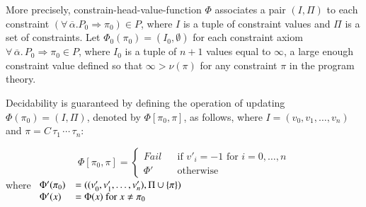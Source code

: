\documentclass[review]{elsarticle}
\begin{document}
\label{Phi0}
More precisely, constrain-head-value-function $\Phi$ associates a pair
$(I,\Pi)$ to each constraint $(\forall\, \overline{\alpha}. P_0
\Rightarrow \pi_0)\in P$, where $I$ is a tuple of constraint values
and $\Pi$ is a set of constraints. Let $\Phi_0(\pi_0) =
(I_0,\emptyset)$ for each constraint axiom $\forall\,
\overline{\alpha}.\,P_0 \Rightarrow \pi_0 \in P$, where $I_0$ is a
tuple of $n+1$ values equal to $\infty$, a large enough constraint
value defined so that $\infty > \nu(\pi)$ for any constraint
$\pi$ in the program theory.

Decidability is guaranteed by defining the operation of updating
$\Phi(\pi_0) = (I,\Pi)$, denoted by $\Phi[\pi_0,\pi]$, as follows,
where $I = (v_0, v_1,\ldots, v_n)$ and $\pi =
C\,\tau_1\,\cdots\,\tau_n$:

\[ \Phi[\pi_0,\pi] = \left\{ \begin{array}{lll}
                                   \textit{Fail}  & & \text{if } v'_i = -1 \text{ for } i=0,\ldots,n \\
                                   \Phi'          & & \text{otherwise}
                             \end{array} \right.
\]
where $\begin{array}[t]{ll}
              \Phi' (\pi_0) &=  ((v'_0,v'_1,\ldots,v'_n), \Pi \cup \{ \pi \} ) \\
              \Phi' (x)      &= \Phi(x) \text{ for } x  \not= \pi_0
              \end{array}$
\end{document}
